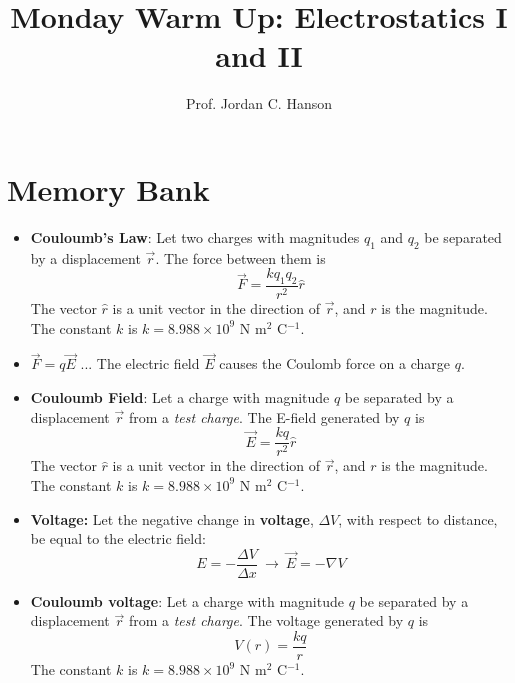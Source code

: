 \documentclass{article}
\begin{document}
\twocolumn

\title{Monday Warm Up: Electrostatics I and II}
\author{Prof. Jordan C. Hanson}

\maketitle

\section{Memory Bank}

\begin{itemize}
\item \textbf{Couloumb's Law}: Let two charges with magnitudes $q_1$ and $q_2$ be separated by a displacement $\vec{r}$.  The force between them is 
\begin{equation}
\vec{F} = \frac{k q_1 q_2}{r^2}\hat{r}
\end{equation}
The vector $\hat{r}$ is a unit vector in the direction of $\vec{r}$, and $r$ is the magnitude.  The constant $k$ is $k=8.988 \times 10^9$ N m$^2$ C$^{-1}$.
\item $\vec{F} = q\vec{E}$ ... The electric field $\vec{E}$ causes the Coulomb force on a charge $q$.
\item \textbf{Couloumb Field}: Let a charge with magnitude $q$ be separated by a displacement $\vec{r}$ from a \textit{test charge}.  The E-field generated by $q$ is 
\begin{equation}
\vec{E} = \frac{k q}{r^2}\hat{r}
\end{equation}
The vector $\hat{r}$ is a unit vector in the direction of $\vec{r}$, and $r$ is the magnitude.  The constant $k$ is $k=8.988 \times 10^9$ N m$^2$ C$^{-1}$.
\item \textbf{Voltage:} Let the negative change in \textbf{voltage}, $\Delta V$, with respect to distance, be equal to the electric field:
\begin{equation}
E = - \frac{\Delta V}{\Delta x} ~\rightarrow~ \vec{E} = -\nabla V
\end{equation}
\item \textbf{Couloumb voltage}: Let a charge with magnitude $q$ be separated by a displacement $\vec{r}$ from a \textit{test charge}.  The voltage generated by $q$ is 
\begin{equation}
V(r) = \frac{k q}{r}
\end{equation}
The constant $k$ is $k=8.988 \times 10^9$ N m$^2$ C$^{-1}$.
\end{itemize}
\end{document}
